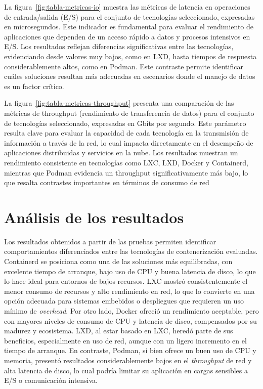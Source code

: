 \noindent
La figura~\ref{fig:tabla-metricas-io} muestra las métricas de latencia en operaciones de entrada/salida (E/S) para el conjunto de tecnologías seleccionado, expresadas en microsegundos. Este indicador es fundamental para evaluar el rendimiento de aplicaciones que dependen de un acceso rápido a datos y procesos intensivos en E/S. Los resultados reflejan diferencias significativas entre las tecnologías, evidenciando desde valores muy bajos, como en LXD, hasta tiempos de respuesta considerablemente altos, como en Podman. Este contraste permite identificar cuáles soluciones resultan más adecuadas en escenarios donde el manejo de datos es un factor crítico.


\noindent
La figura~\ref{fig:tabla-metricas-throughput} presenta una comparación de las métricas de throughput (rendimiento de transferencia de datos) para el conjunto de tecnologías seleccionado, expresadas en Gbits por segundo. Este parámetro resulta clave para evaluar la capacidad de cada tecnología en la transmisión de información a través de la red, lo cual impacta directamente en el desempeño de aplicaciones distribuidas y servicios en la nube. Los resultados muestran un rendimiento consistente en tecnologías como LXC, LXD, Docker y Containerd, mientras que Podman evidencia un throughput significativamente más bajo, lo que resalta contrastes importantes en términos de consumo de red


\section{Análisis de los resultados}
\noindent
Los resultados obtenidos a partir de las pruebas permiten identificar comportamientos diferenciados entre las tecnologías de contenerización evaluadas. Containerd se posiciona como una de las soluciones más equilibradas, con excelente tiempo de arranque, bajo uso de CPU y buena latencia de disco, lo que lo hace ideal para entornos de bajos recursos.
LXC mostró consistentemente el menor consumo de recursos y alto rendimiento en red, lo que lo convierte en una opción adecuada para sistemas embebidos o despliegues que requieren un uso mínimo de \textit{overhead}. 
Por otro lado, Docker ofreció un rendimiento aceptable, pero con mayores niveles de consumo de CPU y latencia de disco, compensados por su madurez y ecosistema. 
LXD, al estar basado en LXC, heredó parte de sus beneficios, especialmente en uso de red, aunque con un ligero incremento en el tiempo de arranque.
En contraste, Podman, si bien ofrece un buen uso de CPU y memoria, presentó resultados considerablemente bajos en el \textit{throughput} de red y alta latencia de disco, lo cual podría limitar su aplicación en cargas sensibles a E/S o comunicación intensiva.

